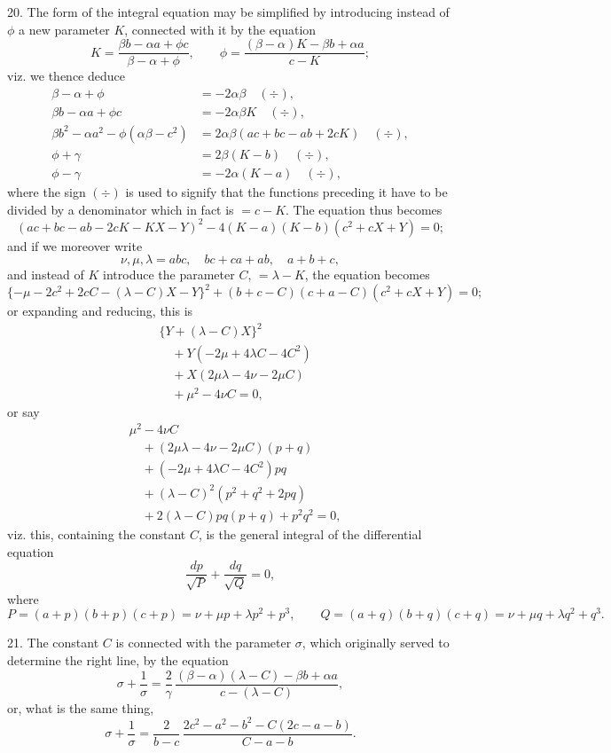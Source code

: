 \documentclass[11pt,a4paper]{article}
\newcommand{\divmark}{\quad(\div)}
\begin{document}
20. The form of the integral equation may be simplified by introducing instead of $\phi$
a new parameter $K$, connected with it by the equation
\[
 K=\frac{\beta b-\alpha a+\phi c}{\beta-\alpha+\phi},
 \qquad
 \phi=\frac{(\beta-\alpha)K-\beta b+\alpha a}{c-K};
\]
viz. we thence deduce
\[
\begin{aligned}
 \beta-\alpha+\phi&=-2\alpha\beta\divmark,\\
 \beta b-\alpha a+\phi c&=-2\alpha\beta K\divmark,\\
 \beta b^2-\alpha a^2-\phi(\alpha\beta-c^2)&=2\alpha\beta(ac+bc-ab+2cK)\divmark,\\
 \phi+\gamma&=2\beta(K-b)\divmark,\\
 \phi-\gamma&=-2\alpha(K-a)\divmark,
\end{aligned}
\]
where the sign $(\div)$ is used to signify that the functions preceding it have to be
divided by a denominator which in fact is $=c-K$. The equation thus becomes
\[
 (ac+bc-ab-2cK-KX-Y)^2-4(K-a)(K-b)(c^2+cX+Y)=0;
\]
and if we moreover write
\[
 \nu,\mu,\lambda=abc,\quad bc+ca+ab,\quad a+b+c,
\]
and instead of $K$ introduce the parameter $C$, $=\lambda-K$, the equation becomes
\[
 \{-\mu-2c^2+2cC-(\lambda-C)X-Y\}^2
 +(b+c-C)(c+a-C)(c^2+cX+Y)=0;
\]
or expanding and reducing, this is
\[
\begin{aligned}
 &\{Y+(\lambda-C)X\}^2\\
 &\quad+Y(-2\mu+4\lambda C-4C^2)\\
 &\quad+X(2\mu\lambda-4\nu-2\mu C)\\
 &\quad+\mu^2-4\nu C=0,
\end{aligned}
\]
or say
\[
\begin{aligned}
 &\mu^2-4\nu C\\
 &\quad+(2\mu\lambda-4\nu-2\mu C)(p+q)\\
 &\quad+(-2\mu+4\lambda C-4C^2)pq\\
 &\quad+(\lambda-C)^2(p^2+q^2+2pq)\\
 &\quad+2(\lambda-C)pq(p+q)+p^2q^2=0,
\end{aligned}
\]
viz. this, containing the constant $C$, is the general integral of the differential equation
\[
 \frac{dp}{\sqrt P}+\frac{dq}{\sqrt Q}=0,
\]
where
\[
 P=(a+p)(b+p)(c+p)=\nu+\mu p+\lambda p^2+p^3,\qquad
 Q=(a+q)(b+q)(c+q)=\nu+\mu q+\lambda q^2+q^3.
\]

21. The constant $C$ is connected with the parameter $\sigma$, which originally served
to determine the right line, by the equation
\[
 \sigma+\frac{1}{\sigma}
 =\frac{2}{\gamma}\,
 \frac{(\beta-\alpha)(\lambda-C)-\beta b+\alpha a}{c-(\lambda-C)},
\]
or, what is the same thing,
\[
 \sigma+\frac{1}{\sigma}
 =\frac{2}{b-c}\,
 \frac{2c^2-a^2-b^2-C(2c-a-b)}{C-a-b}.
\]
\end{document}
